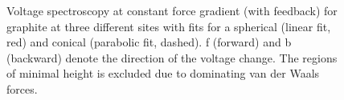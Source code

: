 \documentclass[a4paper]{scrartcl}
\numberwithin{equation}{section}
\numberwithin{figure}{section}
\numberwithin{table}{section}
\begin{document}
\begin{figure}
\hfill
{}
\caption{\small Voltage spectroscopy at constant force gradient (with feedback) for graphite at three different sites with fits for a spherical (linear fit, red) and conical (parabolic fit, dashed). f (forward) and b (backward) denote the direction of the voltage change. The regions of minimal height is excluded due to dominating van der Waals forces.}
\label{fig:tipgraph}
\end{figure}
\end{document}
